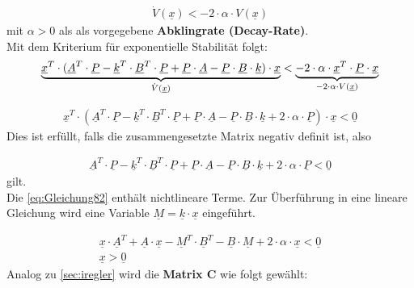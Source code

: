 \begin{align}
    \dot{V}(\underline{x}) < -2\cdot\alpha \cdot V(\underline{x})
\end{align}
\newline
mit $\alpha > 0$ als als vorgegebene \textbf{Abklingrate (Decay-Rate)}.\\

Mit dem Kriterium für exponentielle Stabilität folgt:
\[
    \underbrace{%
        \underline{x}^T\cdot(\underline{A}^T\cdot\underline{P}-\underline{k}^T\cdot\underline{B}^T\cdot\underline{P}+\underline{P}\cdot\underline{A}-\underline{P}\cdot\underline{B}\cdot\underline{k})\cdot\underline{x}
    }_{%
    \dot{V}(\underline{x})
    }
    < 
    \underbrace{%
    -2\cdot\alpha \cdot \underline{x}^T\cdot\underline{P}\cdot\underline{x}
    }_{%
    -2\cdot\alpha\cdot V(\underline{x})
    }
\]

\begin{align} \label{eq:Gleichung82}
     \underline{x}^T\cdot(\underline{A}^T\cdot\underline{P}-\underline{k}^T\cdot\underline{B}^T\cdot\underline{P}+\underline{P}\cdot\underline{A}-\underline{P}\cdot\underline{B}\cdot\underline{k}+2\cdot\alpha\cdot\underline{P})\cdot\underline{x} < \underline{0}
\end{align}
\newline
Dies ist erfüllt, falls die zusammengesetzte Matrix negativ definit ist, also 

\begin{align*}
     \underline{A}^T\cdot\underline{P}-\underline{k}^T\cdot\underline{B}^T\cdot\underline{P}+\underline{P}\cdot\underline{A}-\underline{P}\cdot\underline{B}\cdot\underline{k}+2\cdot\alpha\cdot\underline{P} < \underline{0}
\end{align*}
\newline
gilt.\\
\newline
Die \autoref{eq:Gleichung82} enthält nichtlineare Terme. Zur Überführung in eine lineare Gleichung wird eine Variable $\underline{M}=\underline{k}\cdot\underline{x}$ eingeführt.

\begin{align} \label{eq:Gleichung83}
    \underline{x}\cdot\underline{A}^T+\underline{A}\cdot\underline{x}-\underline{M}^T\cdot\underline{B}^T-\underline{B}\cdot\underline{M}+2\cdot\alpha\cdot\underline{x} < \underline{0} \\
    \underline{x} > \underline{0} \nonumber
\end{align}
\newline
Analog zu \autoref{sec:iregler} wird die \textbf{Matrix C} wie folgt gewählt:

